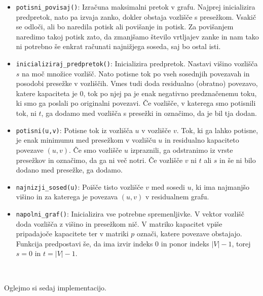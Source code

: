 \documentclass[mat1]{fmfdelo}
\begin{document}
\begin{itemize}
\item \texttt{potisni\_povisaj()}: Izračuna maksimalni pretok v grafu. Najprej iniciali\-zira predpretok, nato pa izvaja zanko, dokler obstaja vozlišče s presežkom. Vsakič se odloči, ali bo naredila potisk ali povišanje in potisk. Za povišanjem naredimo takoj potisk zato, da zmanjšamo število vrtljajev zanke in nam tako ni potrebno še enkrat računati najnižjega soseda, saj bo ostal isti.
\item \texttt{inicializiraj\_predpretok()}: Inicializira predpretok. Nastavi višino voz\-lišča $s$ na moč množice vozlišč. Nato potisne tok po vseh sosednjih povezavah in posodobi presežke v vozliščih. Vmes tudi doda residualno (obratno) pove\-zavo, katere kapaciteta je $0$, tok po njej pa je enak negativno predznačenemu toku, ki smo ga poslali po originalni povezavi. Če vozlišče, v katerega smo potisnili tok, ni $t$, ga dodamo med vozlišča s presežki in označimo, da je bil tja dodan.
\item \texttt{potisni(u,v)}: Potisne tok iz vozlišča $u$ v vozlišče $v$. Tok, ki ga lahko poti\-sne, je enak minimumu med presežkom v vozlišču $u$ in residualno kapaciteto povezave $(u,v)$. Če smo vozlišče $u$ izpraznili, ga odstranimo iz vrste presežkov in označimo, da ga ni več notri. Če vozlišče $v$ ni $t$ ali $s$ in še ni bilo dodano med presežke, ga dodamo.
\item \texttt{najnizji\_sosed(u)}: Poišče tisto vozlišče $v$ med sosedi $u$, ki ima najmanjšo višino in za katerega je povezava $(u,v)$ v residualnem grafu.
\item \texttt{napolni\_graf()}: Inicializira vse potrebne spremenljivke. V vektor vozlišč doda vozlišča z višino in presežkom nič. V matriko kapacitet vpiše pri\-pa\-da\-jo\-če kapacitete ter v matriki $p$ označi, katere povezave obstajajo. Funkcija predpostavi še, da ima izvir indeks $0$ in ponor indeks $|V| - 1$, torej $s = 0$ in $t = |V| - 1$.
\end{itemize}~

Oglejmo si sedaj implementacijo.
\end{document}
